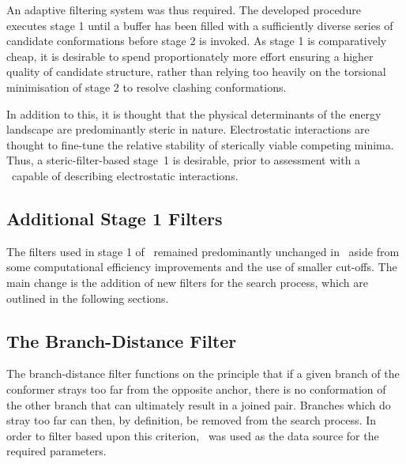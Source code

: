 An adaptive filtering system was thus required. The developed procedure executes stage 1 until a buffer has been filled with a sufficiently diverse series of candidate conformations before stage 2 is invoked. As stage 1 is comparatively cheap, it is desirable to spend proportionately more effort ensuring a higher quality of candidate structure, rather than relying too heavily on the torsional minimisation of stage 2 to resolve clashing conformations.

In addition to this, it is thought that the physical determinants of the energy landscape are predominantly steric in nature. Electrostatic interactions are thought to fine-tune the relative stability of sterically viable competing minima. Thus, a steric-filter-based \mbox{stage 1} is desirable, prior to assessment with a \forcefield\ capable of describing electrostatic interactions.

\subsection{Additional Stage 1 Filters}

The filters used in stage 1 of \prearcus\ remained predominantly unchanged in \arcus\ aside from some computational efficiency improvements  and the use of smaller cut-offs.
The main change is the addition of new filters for the search process, which are outlined in the following sections.




\subsection{The Branch-Distance Filter}
\label{section:arcus:branchDistFilter}

The branch-distance filter functions on the principle that if  a given branch of the conformer strays too far from the opposite anchor, there is no conformation of the other branch that can ultimately result in a joined pair. Branches which do stray too far can then, by definition, be removed from the search process.
In order to filter based upon this criterion, \thothloopdb\ was used as the data source for the required parameters. 

